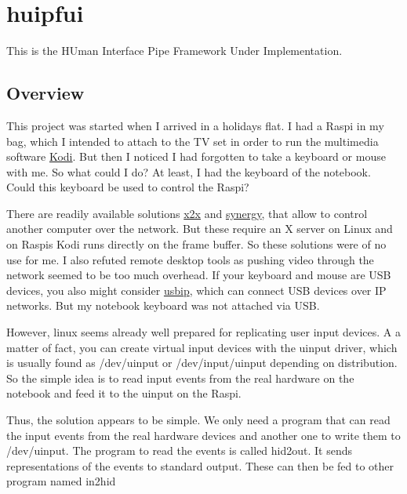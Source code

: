 \newenvironment{pdescription}{\hbox{}\hfill}{}
\newcommand{\pitem}[1]{\\ \textbf{#1}}

\section{huipfui}
\label{huipfui}

This is the HUman Interface Pipe Framework Under Implementation.

\subsection{Overview}
This project was started when I arrived in a holidays flat. I had a
Raspi in my bag, which I intended to attach to the TV set in order to run
the multimedia software \href{http://kodi.tv/}{Kodi}. 
But then I noticed I had forgotten to take a keyboard or mouse with me. 
So what could I do? At least, I
had the keyboard of the notebook. Could this keyboard be used to
control the Raspi?

There are readily available solutions 
\href{http://github.com/dottedmag/x2x}{x2x} and 
\href{http://synergy-project.org/}{synergy}, that allow to
control another computer over the network. But these require an X server
on Linux and on Raspis Kodi runs directly on the frame buffer. So these
solutions were of no use for me. I also refuted remote desktop tools as
pushing video through the network seemed to be too much overhead. If your
keyboard and mouse are USB devices, you also might consider 
\href{http://usbip.sourceforge.net/}{usbip}, which
can connect USB devices over IP networks. But my notebook keyboard was
not attached via USB.

However, linux seems already well prepared for replicating 
user input devices. 
A a matter of fact, you can create virtual
input devices with the uinput driver, which is usually found as
/dev/uinput or /dev/input/uinput depending on distribution. So the
simple idea is to read input events from the real hardware on the
notebook and feed it to the uinput on the Raspi.

Thus, the solution appears to be simple.  We only need a program that
can read the input events from the real hardware devices and another
one to write them to /dev/uinput.  The program to read the events is
called hid2out.  It sends representations of the events to standard
output.  These can then be fed to other program named in2hid

